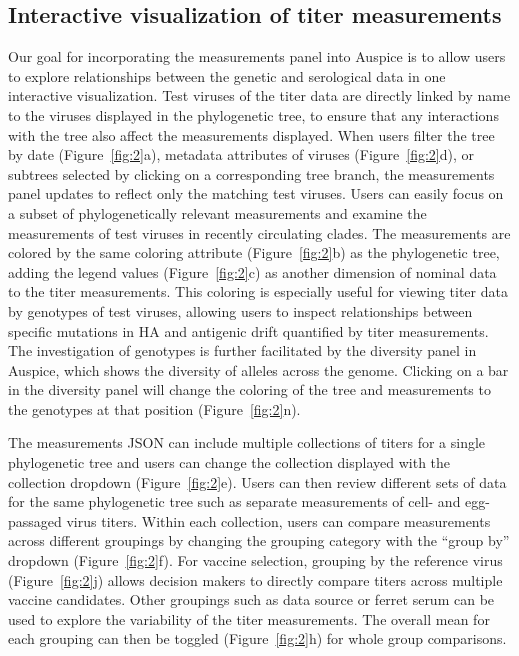 \documentclass[utf8]{FrontiersinHarvard} %
\begin{document}
\subsection{Interactive visualization of titer measurements}

Our goal for incorporating the measurements panel into Auspice is to allow users to explore relationships between the genetic and serological data in one interactive visualization.
Test viruses of the titer data are directly linked by name to the viruses displayed in the phylogenetic tree, to ensure that any interactions with the tree also affect the measurements displayed.
When users filter the tree by date (Figure~\ref{fig:2}a), metadata attributes of viruses (Figure~\ref{fig:2}d), or subtrees selected by clicking on a corresponding tree branch, the measurements panel updates to reflect only the matching test viruses.
Users can easily focus on a subset of phylogenetically relevant measurements and examine the measurements of test viruses in recently circulating clades.
The measurements are colored by the same coloring attribute (Figure~\ref{fig:2}b) as the phylogenetic tree, adding the legend values (Figure~\ref{fig:2}c) as another dimension of nominal data to the titer measurements.
This coloring is especially useful for viewing titer data by genotypes of test viruses, allowing users to inspect relationships between specific mutations in HA and antigenic drift quantified by titer measurements.
The investigation of genotypes is further facilitated by the diversity panel in Auspice, which shows the diversity of alleles across the genome.
Clicking on a bar in the diversity panel will change the coloring of the tree and measurements to the genotypes at that position (Figure~\ref{fig:2}n).

The measurements JSON can include multiple collections of titers for a single phylogenetic tree and users can change the collection displayed with the collection dropdown (Figure~\ref{fig:2}e).
Users can then review different sets of data for the same phylogenetic tree such as separate measurements of cell- and egg-passaged virus titers.
Within each collection, users can compare measurements across different groupings by changing the grouping category with the ``group by'' dropdown (Figure~\ref{fig:2}f).
For vaccine selection, grouping by the reference virus (Figure~\ref{fig:2}j) allows decision makers to directly compare titers across multiple vaccine candidates.
Other groupings such as data source or ferret serum can be used to explore the variability of the titer measurements.
The overall mean for each grouping can then be toggled (Figure~\ref{fig:2}h) for whole group comparisons.
\end{document}
